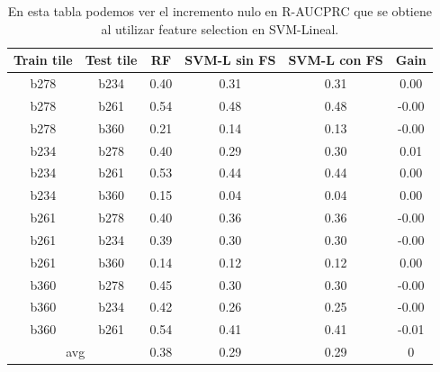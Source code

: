 \begin{table}[h!]
\centering
\begin{tabular}{|c|c|c|c|c|c|}
\hline
\textbf{Train tile} & \textbf{Test tile} & \textbf{RF} & \textbf{SVM-L sin FS} & \textbf{SVM-L con FS} & \textbf{Gain} \\ \hline
b278                & b234               & 0.40        & 0.31                  & 0.31                  & 0.00          \\ \hline
b278                & b261               & 0.54        & 0.48                  & 0.48                  & -0.00         \\ \hline
b278                & b360               & 0.21        & 0.14                  & 0.13                  & -0.00         \\ \hline
b234                & b278               & 0.40        & 0.29                  & 0.30                  & 0.01          \\ \hline
b234                & b261               & 0.53        & 0.44                  & 0.44                  & 0.00          \\ \hline
b234                & b360               & 0.15        & 0.04                  & 0.04                  & 0.00          \\ \hline
b261                & b278               & 0.40        & 0.36                  & 0.36                  & -0.00         \\ \hline
b261                & b234               & 0.39        & 0.30                  & 0.30                  & -0.00         \\ \hline
b261                & b360               & 0.14        & 0.12                  & 0.12                  & 0.00          \\ \hline
b360                & b278               & 0.45        & 0.30                  & 0.30                  & -0.00         \\ \hline
b360                & b234               & 0.42        & 0.26                  & 0.25                  & -0.00         \\ \hline
b360                & b261               & 0.54        & 0.41                  & 0.41                  & -0.01         \\ \hline
\multicolumn{2}{|c|}{avg}                & 0.38        & 0.29                  & 0.29                  & 0             \\ \hline
\end{tabular}
\caption{En esta tabla podemos ver el incremento nulo en R-AUCPRC que se obtiene al utilizar feature selection en SVM-Lineal. }
\label{tab:fs_comparison_l} 
\end{table}

